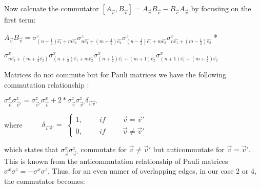\documentclass[12pt]{report}
\begin{document}
	\begin{minipage}{1\textwidth}
		
		Now calcuate the commutator $[A_{\vec{v}},B_{\vec{v}}] = A_{\vec{v}}B_{\vec{v}} - B_{\vec{v}}A_{\vec{v}}$ by focusiing on the first term:\newline
		
		\begin{center}
			
			$ A_{\vec{v}}B_{\vec{v}} =
			\sigma^z_{(n+\frac{1}{2})\hat{e_1} + m\hat{e_2}} \sigma^z_{n\hat{e_1}+(m+\frac{1}{2})\hat{e_2}} \sigma^z_{(n-\frac{1}{2})\hat{e_1} + m\hat{e_2}} \sigma^z_{n\hat{e_1}+(m-\frac{1}{2})\hat{e_2}} $ *
		
			$\sigma^x_{n\hat{e_1} + (m+\frac{1}{2}\hat{e_2})} \sigma^x_{(n+ \frac{1}{2})\hat{e_1} + m\hat{e_2}} \sigma^x_{(n+ \frac{1}{2})\hat{e_1} + (m + 1)\hat{e_2}} \sigma^x_{(n+ 1)\hat{e_1} + (m + \frac{1}{2})\hat{e_2}}$\newline
			
		\end{center}
		
		
		Matrices do not commute but for Pauli matrices we have the following commutation relationship :\newline
		
		
		\begin{center}
			$\sigma^x_{\vec{v}}\sigma^z_{\vec{v}'} = \sigma^z_{\vec{v}'} \sigma^x_{\vec{v}} + 2* \sigma^x_{\vec{v}}\sigma^z_{\vec{v}'} \delta_{\vec{v} \vec{v}'}$\newline
	    \end{center}
	    
		
		where $\hspace{1cm} \delta_{\vec{v} \vec{v}'} =$
		$\begin{cases}
			1, \hspace{1cm} if \hspace{1cm}  \vec{v} = \vec{v}'\\
			0, \hspace{1cm} if \hspace{1cm} \vec{v} \neq \vec{v}'
		\end{cases}$\newline
		
		which states that 	$\sigma^x_{\vec{v}}\sigma^z_{\vec{v}'}$ commutate for $\vec{v} \neq \vec{v}'$   but anticommutate for $\vec{v} = \vec{v}'$. This is known from the anticommutation relationship of Pauli matrices $\sigma^x \sigma^z = - \sigma^x \sigma^z$. Thus, for an even numer of overlapping edges, in our case 2 or 4, the commutator becomes:\newline
	

\end{minipage}
\end{document}
